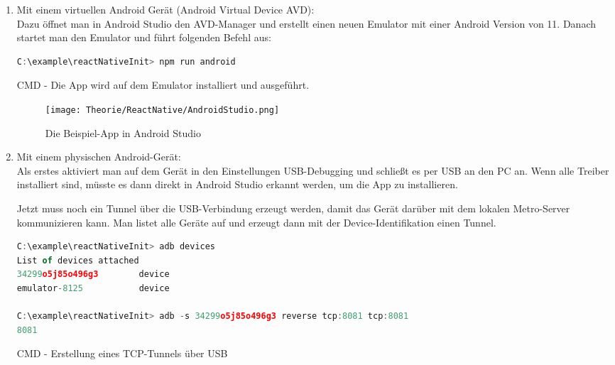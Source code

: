 \begin{enumerate}
  \item Mit einem virtuellen Android Gerät (Android Virtual Device AVD):\\
Dazu öffnet man in Android Studio den AVD-Manager und erstellt einen neuen Emulator mit einer
Android Version von 11. Danach startet man den Emulator und führt folgenden Befehl aus:

\begin{code}[htp]
\begin{lstlisting}[firstnumber=1,language=JavaScript, style=CMD]
C:\example\reactNativeInit> npm run android
\end{lstlisting}
\caption{CMD - Die App wird auf dem Emulator installiert und ausgeführt.}
\end{code}

\begin{figure}[H]
  \begin{center}
    \texttt{[image: Theorie/ReactNative/AndroidStudio.png]}
    \caption{Die Beispiel-App in Android Studio}
  \end{center}
\end{figure}

\newpage
  \item Mit einem physischen Android-Gerät:\\
Als erstes aktiviert man auf dem Gerät in den Einstellungen USB-Debugging und schließt es per USB an
den PC an. Wenn alle Treiber installiert sind, müsste es dann direkt in Android Studio erkannt
werden, um die App zu installieren.

Jetzt muss noch ein Tunnel über die USB-Verbindung erzeugt werden, damit das Gerät darüber mit dem
lokalen Metro-Server kommunizieren kann. Man listet alle Geräte auf und erzeugt dann mit der
Device-Identifikation einen Tunnel.

\begin{code}[htp]
\begin{lstlisting}[firstnumber=1,language=JavaScript, style=CMD]
C:\example\reactNativeInit> adb devices
List of devices attached
34299o5j85o496g3        device
emulator-8125           device

C:\example\reactNativeInit> adb -s 34299o5j85o496g3 reverse tcp:8081 tcp:8081
8081
\end{lstlisting}
\caption{CMD - Erstellung eines TCP-Tunnels über USB}
\end{code}

\end{enumerate}
